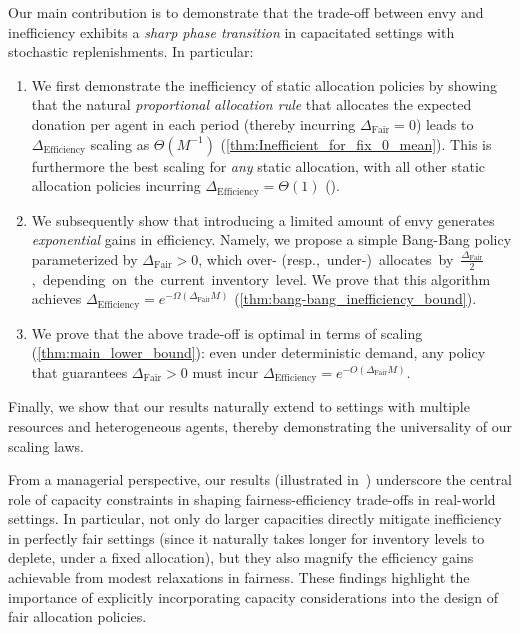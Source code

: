 \documentclass[mnsc,nonblindrev]{informs3}
\newcommand{\Deff}{\Delta_{\text{Efficiency}}\xspace}
\newcommand{\Dfair}{\Delta_{\text{Fair}}\xspace}
\begin{document}
Our main contribution is to demonstrate that the trade-off between envy and inefficiency exhibits a {\it sharp phase transition} in capacitated settings with stochastic replenishments. In particular:
\begin{enumerate}[leftmargin=0.5cm]
\item We first demonstrate the inefficiency of static allocation policies by showing that the natural \emph{proportional allocation rule} that allocates {the expected donation per agent in each period} (thereby incurring $\Dfair = 0$) leads to $\Deff$ scaling as {$\Theta(M^{-1})$} (\cref{thm:Inefficient_for_fix_0_mean}). This is furthermore the best scaling for {\it any} static allocation, with all other static allocation policies incurring \mbox{$\Deff = \Theta(1)$} ().
\item We subsequently show that introducing a limited amount of envy generates {\it exponential} gains in efficiency. Namely, we propose a simple Bang-Bang policy parameterized by $\Dfair > 0$, which over- \mbox{(resp., under-) allocates by $\frac{\Dfair}{2}$, depending on the current inventory level}. We prove that this algorithm achieves
$\Deff = e^{-\Omega(\Dfair M)}$ (\cref{thm:bang-bang_inefficiency_bound}).
\item We prove that the above trade-off is optimal in terms of scaling
(\cref{thm:main_lower_bound}):
even under deterministic demand, any policy that guarantees $\Dfair>0$ must incur {$\Deff =  e^{-O(\Dfair M)}$}. 
\end{enumerate}
Finally, we show that our results naturally extend to settings with multiple resources and heterogeneous agents, thereby demonstrating the universality of our scaling laws. 


From a managerial perspective, our results (illustrated in~) underscore the central role of capacity constraints in shaping fairness-efficiency trade-offs in real-world settings. In particular, not only do larger capacities directly mitigate inefficiency in perfectly fair settings (since it naturally takes longer for inventory levels to deplete, under a fixed allocation), but they also magnify the efficiency gains achievable from modest relaxations in fairness. These findings highlight the importance of explicitly incorporating capacity considerations into the design of fair allocation policies.
\end{document}
